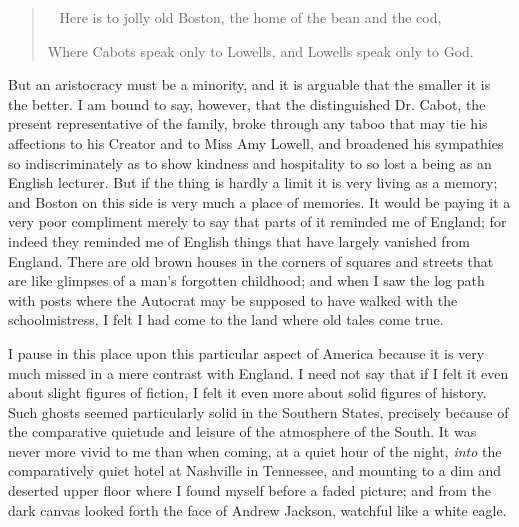 \documentclass{book}
\newenvironment{mdblockquote}{%
  \begin{quotation}
    \
}{%
  \end{quotation}
}
\begin{document}
\begin{mdblockquote}
	Here is to jolly old Boston, the home of the bean and the cod,

	Where Cabots speak only to Lowells, and Lowells speak only to God.


\end{mdblockquote}
But an aristocracy must be a minority, and it is arguable that the smaller it is the better. I am bound to say, however, that the distinguished Dr. Cabot, the present representative of the family, broke through any taboo that may tie his affections to his Creator and to Miss Amy Lowell, and broadened his sympathies so indiscriminately as to show kindness and hospitality to so lost a being as an English lecturer. But if the thing is hardly a limit it is very living as a memory; and Boston on this side is very much a place of memories. It would be paying it a very poor compliment merely to say that parts of it reminded me of England; for indeed they reminded me of English things that have largely vanished from England. There are old brown houses in the corners of squares and streets that are like glimpses of a man’s forgotten childhood; and when I saw the log path with posts where the Autocrat may be supposed to have walked with the schoolmistress, I felt I had come to the land where old tales come true.

I pause in this place upon this particular aspect of America because it is very much missed in a mere contrast with England. I need not say that if I felt it even about slight figures of fiction, I felt it even more about solid figures of history. Such ghosts seemed particularly solid in the Southern States, precisely because of the comparative quietude and leisure of the atmosphere of the South. It was never more vivid to me than when coming, at a quiet hour of the night, \emph{into} the comparatively quiet hotel at Nashville in Tennessee, and mounting to a dim and deserted upper floor where I found myself before a faded picture; and from the dark canvas looked forth the face of Andrew Jackson, watchful like a white eagle.
\end{document}
